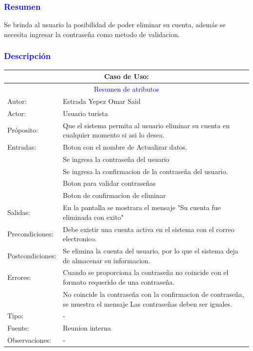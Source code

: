 \subsubsection{\textcolor{blue}{Resumen}}
Se brinda al usuario la posibilidad de poder eliminar su cuenta, además se necesita ingresar la contraseña como metodo de validacion.
\subsubsection{\textcolor{blue}{Descripción}}
\begin{tabularx}{16cm}{||l|X||}
	\hline
	\multicolumn{2}{||c||}{Caso de Uso: } \\
	\hline
	\multicolumn{2}{||c||}{\textcolor{blue}{Resumen de atributos}} \\
	\hline
	{Autor:} & Estrada Yepez Omar Said \\
    \hline
	{Actor:} & Usuario turista\\
	\hline
	{Próposito:} & Que el sistema permita al usuario eliminar su cuenta en cualquier momento si asi lo desea.\\
	\hline
	{Entradas:} &  Boton con el nombre de Actualizar datos. \\
    &Se ingresa la contraseña del usuario\\
    &Se ingresa la confirmacion de la contraseña del usuario.\\
    &Boton para validar contraseñas\\
    &Boton de confirmacion de eliminar\\
	\hline
	{Salidas:} & En la pantalla se mostrara el mensaje "Su cuenta fue eliminada con exito"\\
	\hline
	{Precondiciones:} & Debe existir una cuenta activa en el sistema con el correo electronico.\\ 
	\hline
	{Postcondiciones:} & Se elimina la cuenta del usuario, por lo que el sistema deja de almacenar su informacion.\\
	\hline
	{Errores:} & Cuando se proporciona la contraseña no coincide con el formato requerido de una contraseña. \\
    &No coincide la contraseña con la confirmacion de contraseña, se muestra el mensaje Las contraseñas deben ser iguales.\\
	\hline
	{Tipo:} & -\\
	\hline
	{Fuente:} & Reunion interna \\
	\hline
	{Observaciones:} & {-} \\
	\hline
\end{tabularx}

